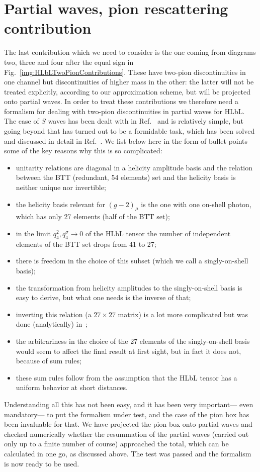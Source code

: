 \documentclass[epj]{webofc}
\newcommand{\<}{\langle}
\renewcommand{\>}{\rangle}
\begin{document}
\section{Partial waves, pion rescattering contribution}\label{rescatt}
The last contribution which we need to consider is the one coming from
diagrams two, three and four after the equal sign in
Fig.~\ref{img:HLbLTwoPionContributions}. These have two-pion
discontinuities in one channel but discontinuities of higher mass in the
other: the latter will not be treated explicitly, according to our
approximation scheme, but will be projected onto partial waves. In order to
treat these contributions we therefore need a formalism for dealing with
two-pion discontinuities in partial waves for HLbL. The case of $S$ waves
has been dealt with in Ref.~\cite{Colangelo:2014dfa} and is relatively
simple, but going beyond that has turned out to be a formidable task, which
has been solved and discussed in detail in
Ref.~\cite{Colangelo:2017fiz}. We list below here in the form of bullet
points some of the key reasons why this is so complicated:
\begin{itemize}
\item unitarity relations are diagonal in a helicity amplitude basis and
  the relation between the BTT (redundant, 54 elements) set and the helicity
  basis is neither unique nor invertible;
\item the helicity basis relevant for $(g-2)_\mu$ is the one with one
  on-shell photon, which has only 27 elements (half of the BTT set);
\item
  in the limit $q_4^2, q_4^\sigma \to 0$ of the HLbL tensor the number of
  independent elements of the BTT set drops from 41 to 27;
\item there is freedom in the choice of this subset (which we call a
  singly-on-shell basis); 
\item
  the transformation from helicity amplitudes to the singly-on-shell
  basis is easy to derive, but what one needs is the inverse of that;
\item
  inverting this relation (a $27\times 27$ matrix) is a lot more
  complicated but was done (analytically) in~\cite{Colangelo:2017fiz}; 
\item
  the arbitrariness in the choice of the 27 elements of the
  singly-on-shell basis would seem to affect the final result at first
  sight, but in fact it does not, because of sum rules;
\item
  these sum rules follow from the assumption that the HLbL tensor
  has a uniform behavior at short distances.
\end{itemize}
Understanding all this has not been easy, and it has been very important---
even mandatory--- to put the formalism under test, and the case of the pion
box has been invaluable for that. We have projected the pion box onto
partial waves and checked numerically whether the resummation of the
partial waves (carried out only up to a finite number of course) approached
the total, which can be calculated in one go, as discussed above. The test
was passed and the formalism is now ready to be used.
\end{document}
